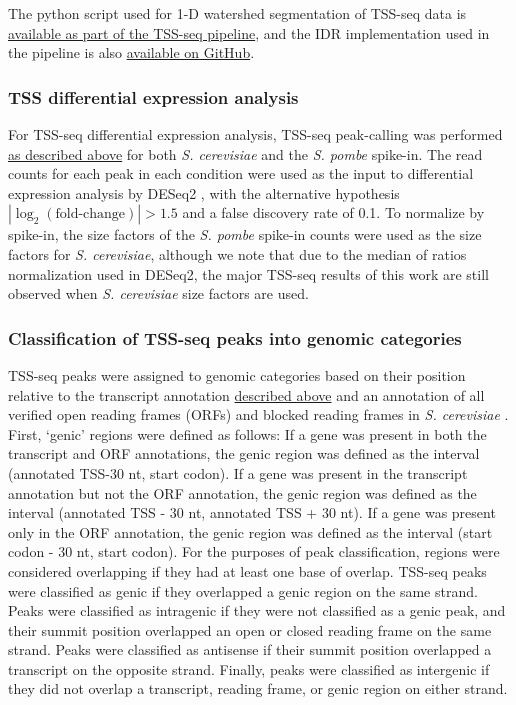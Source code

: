 The python script used for 1-D watershed segmentation of TSS-seq data is \href{https://github.com/winston-lab/tss-seq/blob/master/scripts/tss_peakcalling.py}{available as part of the TSS-seq pipeline}, and the IDR implementation used in the pipeline is also \href{https://github.com/nboley/idr}{available on GitHub}.

\subsubsection{TSS differential expression analysis}
\label{subsubsec:tss_differential_expression}

For TSS-seq differential expression analysis, TSS-seq peak-calling was performed \hyperref[subsubsec:tss_peak_calling]{as described above} for both \textit{S. cerevisiae} and the \textit{S. pombe} spike-in.
The read counts for each peak in each condition were used as the input to differential expression analysis by DESeq2 \citep{love2014}, with the alternative hypothesis $\allowbreak \left\lvert\log_2 \left(\text{fold-change}\right) \right\rvert > 1.5$ and a false discovery rate of 0.1.
To normalize by spike-in, the size factors of the \textit{S. pombe} spike-in counts were used as the size factors for \textit{S. cerevisiae}, although we note that due to the median of ratios normalization used in DESeq2, the major TSS-seq results of this work are still observed when \textit{S. cerevisiae} size factors are used.

\subsubsection{Classification of TSS-seq peaks into genomic categories}
\label{subsubsec:tss_peak_classification}

TSS-seq peaks were assigned to genomic categories based on their position relative to the transcript annotation \hyperref[subsubsec:tss_reannotation]{described above} and an annotation of all verified open reading frames (ORFs) and blocked reading frames in \textit{S. cerevisiae} \citep{engel2014}.
First, `genic' regions were defined as follows: If a gene was present in both the transcript and ORF annotations, the genic region was defined as the interval (annotated TSS-30 nt, start codon).
If a gene was present in the transcript annotation but not the ORF annotation, the genic region was defined as the interval (annotated TSS - 30 nt, annotated TSS + 30 nt).
If a gene was present only in the ORF annotation, the genic region was defined as the interval (start codon - 30 nt, start codon).
For the purposes of peak classification, regions were considered overlapping if they had at least one base of overlap.
TSS-seq peaks were classified as genic if they overlapped a genic region on the same strand.
Peaks were classified as intragenic if they were not classified as a genic peak, and their summit position overlapped an open or closed reading frame on the same strand.
Peaks were classified as antisense if their summit position overlapped a transcript on the opposite strand.
Finally, peaks were classified as intergenic if they did not overlap a transcript, reading frame, or genic region on either strand.

